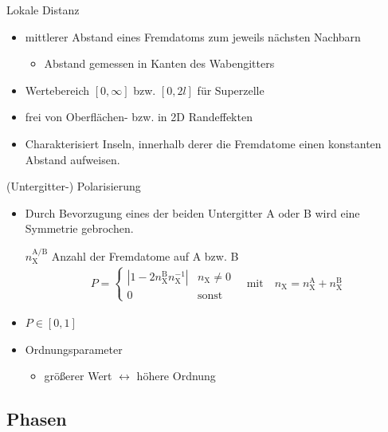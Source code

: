 \documentclass{beamer}
\newcommand \abs[1]{\left | #1 \right |}
\def \nX {n_\mathrm{X}}
\begin{document}
	\begin{frame}{Lokale Distanz}
		\begin{itemize}
			\item mittlerer Abstand eines Fremdatoms zum jeweils nächsten Nachbarn
			\begin{itemize}
				\item Abstand gemessen in Kanten des Wabengitters
			\end{itemize}
			\item Wertebereich $[0, \infty]$ bzw. $[0, 2 l]$ für Superzelle
			\item frei von Oberflächen- bzw. in 2D Randeffekten
			\item Charakterisiert Inseln, innerhalb derer die Fremdatome einen konstanten Abstand aufweisen.
		\end{itemize}
	\end{frame}

	\begin{frame}{(Untergitter-) Polarisierung}
		\begin{itemize}
			\item Durch Bevorzugung eines der beiden Untergitter A oder B wird eine Symmetrie gebrochen.
			\item[$\nX^\text{A/B}$] Anzahl der Fremdatome auf A bzw. B
			\begin{align*}
				P = \begin{cases} \abs{1 - 2 \nX^\text{B} \nX^{-1}} & \nX \neq 0 \\ 0 & \text{sonst} \end{cases} \quad \text{mit} \quad \nX = \nX^\text{A} + \nX^\text{B}
			\end{align*}
			\item $P \in [0, 1]$
			\item Ordnungsparameter
			\begin{itemize}
				\item größerer Wert $\leftrightarrow$ höhere Ordnung
			\end{itemize}
		\end{itemize}
	\end{frame}

	\subsection{Phasen}
	
\end{document}
